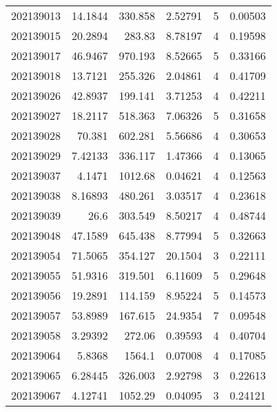 \begin{tabular}{rrrrrr}
 202139013 &         14.1844  &      330.858  &            2.52791 &           5 & 0.00503 \\
 202139015 &         20.2894  &      283.83   &            8.78197 &           4 & 0.19598 \\
 202139017 &         46.9467  &      970.193  &            8.52665 &           5 & 0.33166 \\
 202139018 &         13.7121  &      255.326  &            2.04861 &           4 & 0.41709 \\
 202139026 &         42.8937  &      199.141  &            3.71253 &           4 & 0.42211 \\
 202139027 &         18.2117  &      518.363  &            7.06326 &           5 & 0.31658 \\
 202139028 &         70.381   &      602.281  &            5.56686 &           4 & 0.30653 \\
 202139029 &          7.42133 &      336.117  &            1.47366 &           4 & 0.13065 \\
 202139037 &          4.1471  &     1012.68   &            0.04621 &           4 & 0.12563 \\
 202139038 &          8.16893 &      480.261  &            3.03517 &           4 & 0.23618 \\
 202139039 &         26.6     &      303.549  &            8.50217 &           4 & 0.48744 \\
 202139048 &         47.1589  &      645.438  &            8.77994 &           5 & 0.32663 \\
 202139054 &         71.5065  &      354.127  &           20.1504  &           3 & 0.22111 \\
 202139055 &         51.9316  &      319.501  &            6.11609 &           5 & 0.29648 \\
 202139056 &         19.2891  &      114.159  &            8.95224 &           5 & 0.14573 \\
 202139057 &         53.8989  &      167.615  &           24.9354  &           7 & 0.09548 \\
 202139058 &          3.29392 &      272.06   &            0.39593 &           4 & 0.40704 \\
 202139064 &          5.8368  &     1564.1    &            0.07008 &           4 & 0.17085 \\
 202139065 &          6.28445 &      326.003  &            2.92798 &           3 & 0.22613 \\
 202139067 &          4.12741 &     1052.29   &            0.04095 &           3 & 0.24121 \\

\end{tabular}
